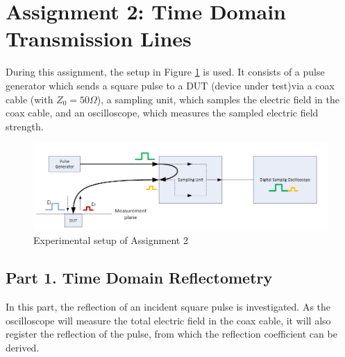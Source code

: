 \section*{Assignment 2: Time Domain Transmission Lines}

During this assignment, the setup in Figure \ref{fig:Ass2_setup} is used. It consists of a pulse generator which sends a square pulse to a DUT (device under test)via a coax cable (with $Z_0 = 50 \Omega$), a sampling unit, which samples the electric field in the coax cable, and an oscilloscope, which measures the sampled electric field strength.\\

\begin{figure}[h]
    \centering
    \includegraphics[width=1\textwidth]{Session1_files/Assignment2_setup.PNG}
    \caption{Experimental setup of Assignment 2}
    \label{fig:Ass2_setup}
\end{figure}

\subsection*{Part 1. Time Domain Reflectometry}

In this part, the reflection of an incident square pulse is investigated. As the oscilloscope will measure the total electric field in the coax cable, it will also register the reflection of the pulse, from which the reflection coefficient can be derived.

